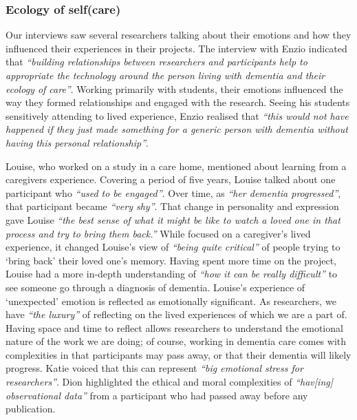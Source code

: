 \subsubsection{Ecology of self(care)}
\label{Ethics:ThemePartTwo:Care}
Our interviews saw several researchers talking about their emotions and how they influenced their experiences in their projects. The interview with Enzio indicated that \textit{``building relationships between researchers and participants help to appropriate the technology around the person living with dementia and their ecology of care''}. Working primarily with students, their emotions influenced the way they formed relationships and engaged with the research. Seeing his students sensitively attending to lived experience, Enzio realised that \textit{``this would not have happened if they just made something for a generic person with dementia without having this personal relationship''}. 

Louise, who worked on a study in a care home, mentioned about learning from a caregivers experience. Covering a period of five years, Louise talked about one participant who \textit{``used to be engaged''}. Over time, as \textit{``her dementia progressed''}, that participant became \textit{``very shy''}. That change in personality and expression gave Louise \textit{``the best sense of what it might be like to watch a loved one in that process and try to bring them back.''} While focused on a caregiver’s lived experience, it changed Louise’s view of \textit{``being quite critical''} of people trying to `bring back' their loved one’s memory. Having spent more time on the project, Louise had a more in-depth understanding of \textit{``how it can be really difficult''} to see someone go through a diagnosis of dementia. Louise’s experience of `unexpected' emotion is reflected as emotionally significant. As researchers, we have \textit{``the luxury''} of reflecting on the lived experiences of which we are a part of. Having space and time to reflect allows researchers to understand the emotional nature of the work we are doing; of course, working in dementia care comes with complexities in that participants may pass away, or that their dementia will likely progress. Katie voiced that this can represent \textit{``big emotional stress for researchers''}. Dion highlighted the ethical and moral complexities of \textit{``hav[ing] observational data''} from a participant who had passed away before any publication. 

